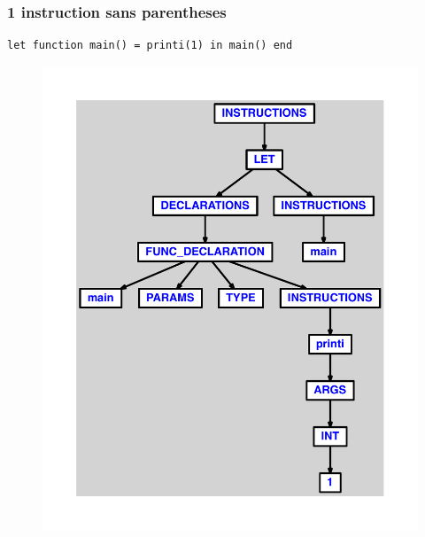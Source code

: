 \documentclass{article}
\begin{document}
\subsubsection{1 instruction sans parentheses}
\begin{lstlisting}
let function main() = printi(1) in main() end
\end{lstlisting}
\newpage
\begin{figure}[H]
\centering
\includegraphics[max width=\textwidth]{ast/ast_138.pdf}
\end{figure}
\newpage
\end{document}
